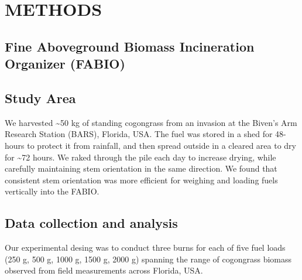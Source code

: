 \documentclass[11pt,a4paper]{article}
\begin{document}
\section{METHODS}\label{methods}

\subsection{Fine Aboveground Biomass Incineration Organizer
(FABIO)}\label{fine-aboveground-biomass-incineration-organizer-fabio}

\subsection{Study Area}\label{study-area}

We harvested \textasciitilde{}50 kg of standing cogongrass from an
invasion at the Biven's Arm Research Station (BARS), Florida, USA. The
fuel was stored in a shed for 48-hours to protect it from rainfall, and
then spread outside in a cleared area to dry for \textasciitilde{}72
hours. We raked through the pile each day to increase drying, while
carefully maintaining stem orientation in the same direction. We found
that consistent stem orientation was more efficient for weighing and
loading fuels vertically into the FABIO.

\subsection{Data collection and
analysis}\label{data-collection-and-analysis}

Our experimental desing was to conduct three burns for each of five fuel
loads (250 g, 500 g, 1000 g, 1500 g, 2000 g) spanning the range of
cogongrass biomass observed from field measurements across Florida, USA.
\end{document}
